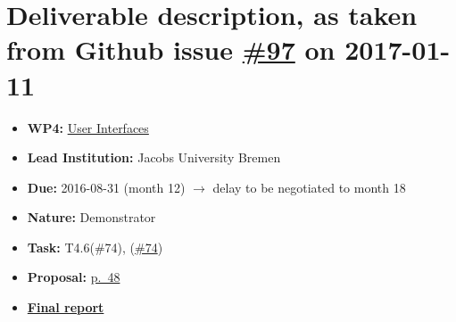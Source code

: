 \section*{\texorpdfstring{Deliverable description, as taken from Github
issue
\href{https://github.com/OpenDreamKit/OpenDreamKit/issues/91}{\#97} on
2017-01-11}{Deliverable description, as taken from Github issue \#97 on 2017-01-11}}\label{deliverable-description-as-taken-from-github-issue-97-on-2017-01-11}

\begin{itemize}
\tightlist
\item
  \textbf{WP4:}
  \href{https://github.com/OpenDreamKit/OpenDreamKit/tree/master/WP4}{User
  Interfaces}
\item
  \textbf{Lead Institution:} Jacobs University Bremen
\item
  \textbf{Due:} 2016-08-31 (month 12) $\rightarrow$ delay to be negotiated to month 18
\item
  \textbf{Nature:} Demonstrator
\item
  \textbf{Task:}  T4.6(\#74), 
  (\href{https://github.com/OpenDreamKit/OpenDreamKit/issues/74}{\#74})  
\item
  \textbf{Proposal:}
  \href{https://github.com/OpenDreamKit/OpenDreamKit/raw/master/Proposal/proposal-www.pdf}{p.~48}
\item
  \textbf{\href{https://github.com/OpenDreamKit/OpenDreamKit/raw/master/WP4/D4.8/report-final.pdf}{Final
  report}}
\end{itemize}


